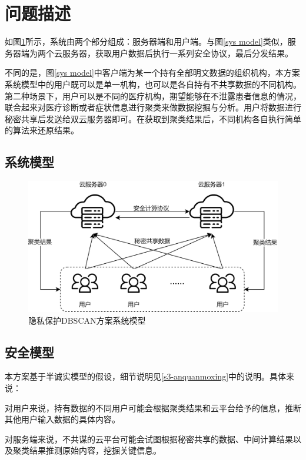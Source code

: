 \section{问题描述}
\label{s4-wenti}
如图\ref{s4-sysmod}所示，系统由两个部分组成：服务器端和用户端。与图\ref{sys model}类似，服务器端为两个云服务器，获取用户数据后执行一系列安全协议，最后分发结果。

不同的是，图\ref{sys model}中客户端为某一个持有全部明文数据的组织机构，本方案系统模型中的用户既可以是单一机构，也可以是各自持有不共享数据的不同机构。第二种场景下，用户可以是不同的医疗机构，期望能够在不泄露患者信息的情况，联合起来对医疗诊断或者症状信息进行聚类来做数据挖掘与分析。用户将数据进行秘密共享后发送给双云服务器即可。在获取到聚类结果后，不同机构各自执行简单的算法来还原结果。

\subsection{系统模型}
\begin{figure}[htbp]
	\centering
	\includegraphics[width=0.7\linewidth]{img/sysmodel2.png}%
	\caption{隐私保护DBSCAN方案系统模型}
	\label{s4-sysmod}
\end{figure}

\subsection{安全模型}
本方案基于半诚实模型的假设，细节说明见\ref{s3-anquanmoxing}中的说明。具体来说：

对用户来说，持有数据的不同用户可能会根据聚类结果和云平台给予的信息，推断其他用户输入数据的具体内容。

对服务端来说，不共谋的云平台可能会试图根据秘密共享的数据、中间计算结果以及聚类结果推测原始内容，挖掘关键信息。
